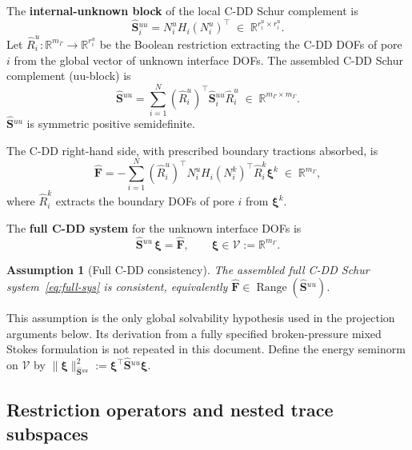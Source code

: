 \documentclass[11pt,a4paper]{article}
\newtheorem{assumption}[theorem]{Assumption}
\theoremstyle{definition}
\newcommand{\R}{\mathbb{R}}
\newcommand{\Schur}{\mathbf{S}}
\newcommand{\Shatuu}{\widehat{\Schur}{}^{uu}}
\newcommand{\Fhat}{\widehat{\bm{F}}}
\newcommand{\Range}{\operatorname{Range}}
\newcommand{\Vspace}{\mathcal{V}}
\begin{document}
The \textbf{internal-unknown block} of the local C-DD Schur complement is
\begin{equation}\label{eq:Shat-local}
  \Shatuu_i = N_i^u H_i (N_i^u)^\top \;\in\; \R^{r_i^u\times r_i^u}.
\end{equation}
Let $\widehat{R}_i^u : \R^{m_\Gamma} \to \R^{r_i^u}$ be the Boolean
restriction extracting the C-DD DOFs of pore $i$ from the global
vector of unknown interface DOFs.  The assembled C-DD Schur complement
(uu-block) is
\begin{equation}\label{eq:Shat}
  \Shatuu = \sum_{i=1}^N (\widehat{R}_i^u)^\top \Shatuu_i \widehat{R}_i^u
  \;\in\; \R^{m_\Gamma\times m_\Gamma}.
\end{equation}
$\Shatuu$ is symmetric positive semidefinite.

The C-DD right-hand side, with prescribed boundary tractions absorbed,
is
\begin{equation}\label{eq:Fhat}
  \Fhat = -\sum_{i=1}^N (\widehat{R}_i^u)^\top
    N_i^u H_i (N_i^k)^\top \widehat{R}_i^k \bm{\xi}^k
  \;\in\; \R^{m_\Gamma},
\end{equation}
where $\widehat{R}_i^k$ extracts the boundary DOFs of pore $i$ from
$\bm{\xi}^k$.

The \textbf{full C-DD system} for the unknown interface DOFs is
\begin{equation}\label{eq:full-sys}
  \Shatuu\,\bm{\xi} = \Fhat,\qquad \bm{\xi}\in\Vspace:=\R^{m_\Gamma}.
\end{equation}
\begin{assumption}[Full C-DD consistency]\label{ass:consistency}
  The assembled full C-DD Schur system~\eqref{eq:full-sys} is consistent,
  equivalently
  $\Fhat\in\Range(\Shatuu)$.
\end{assumption}
This assumption is the only global solvability hypothesis used in the
projection arguments below.  Its derivation from a fully specified
broken-pressure mixed Stokes formulation is not repeated in this
document.
Define the energy seminorm on $\Vspace$ by
$\|\bm{\xi}\|_{\Shatuu}^2 := \bm{\xi}^\top \Shatuu \bm{\xi}$.

\subsection{Restriction operators and nested trace subspaces}
\end{document}
